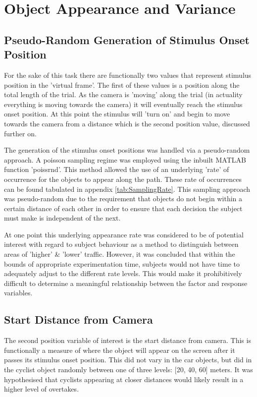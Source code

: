 \section{Object Appearance and Variance}
\subsection{Pseudo-Random Generation of Stimulus Onset Position}
For the sake of this task there are functionally two values that represent stimulus position in the 'virtual frame'. The first of these values is a position along the total length of the trial. As the camera is 'moving' along the trial (in actuality everything is moving towards the camera) it will eventually reach the stimulus onset position. At this point the stimulus will 'turn on' and begin to move towards the camera from a distance which is the second position value, discussed further on.

The generation of the stimulus onset positions was handled via a pseudo-random approach. A poisson sampling regime was employed using the inbuilt MATLAB function 'poissrnd'. This method allowed the use of an underlying 'rate' of occurrence for the objects to appear along the path. These rate of occurrences can be found tabulated in appendix \ref{tab:SamplingRate}. This sampling approach was pseudo-random due to the requirement that objects do not begin within a certain distance of each other in order to ensure that each decision the subject must make is independent of the next.

At one point this underlying appearance rate was considered to be of potential interest with regard to subject behaviour as a method to distinguish between areas of 'higher' \& 'lower' traffic. However, it was concluded that within the bounds of appropriate experimentation time, subjects would not have time to adequately adjust to the different rate levels. This would make it prohibitively difficult to determine a meaningful relationship between the factor and response variables. 

\subsection{Start Distance from Camera}
The second position variable of interest is the start distance from camera. This is functionally a measure of where the object will appear on the screen after it passes its stimulus onset position. This did not vary in the car objects, but did in the cyclist object randomly between one of three levels: [20, 40, 60] meters. It was hypothesised that cyclists appearing at closer distances would likely result in a higher level of overtakes.

